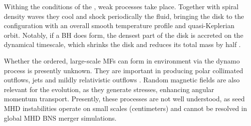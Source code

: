 Withing the conditions of the \pmerg{}, weak processes take place. 
Together with spiral density waves they cool and shock periodically the 
fluid, bringing the disk to the configuration with an overall smooth 
temperature profile 
and quasi-Keplerian orbit.
%
Notably, if a \ac{BH} does form, the densest part of the disk is 
accreted on the dynamical timescale, which shrinks the disk and reduces its total mass by half 
\citep{Perego:2019adq}.


Whether the ordered, large-scale \acp{MF} can form in \pmerg{} environment 
via the dynamo process is presently unknown. They are important in producing 
polar collimated outflows, jets \citep{Bucciantini:2011kx,Ruiz:2016rai} and mildly relativistic 
outflows \citep{Metzger:2018qfl,Fernandez:2018kax}. Random magnetic fields are also 
relevant for the \pmerg{} evolution, as they generate stresses, enhancing angular momentum transport. 
Presently, these processes are not well understood, as seed \ac{MHD} instabilities operate 
on small scales (centimeters) and cannot be resolved in global \ac{MHD} \ac{BNS} merger 
simulations.


